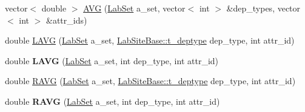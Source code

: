 \begin{DoxyCompactItemize}
\item 
vector$<$ double $>$ \hyperlink{classelps_1_1_lab_site_sets_calculator_a44b6d16e8dded5bdb17e45b59702b8c1}{A\+V\+G} (\hyperlink{classelps_1_1_lab_set}{Lab\+Set} a\+\_\+set, vector$<$ int $>$ \&dep\+\_\+types, vector$<$ int $>$ \&attr\+\_\+ids)
\item 
double \hyperlink{classelps_1_1_lab_site_sets_calculator_a55d8679aa0dff3104dc07af7639a7dc2}{L\+A\+V\+G} (\hyperlink{classelps_1_1_lab_set}{Lab\+Set} a\+\_\+set, \hyperlink{classelps_1_1_lab_site_base_a8ec08fafa015dfa53827d985608afe58}{Lab\+Site\+Base\+::t\+\_\+deptype} dep\+\_\+type, int attr\+\_\+id)
\item 
\hypertarget{classelps_1_1_lab_site_sets_calculator_a15ef11e25f40be9c5f6c6e20a976fa6d}{double {\bfseries L\+A\+V\+G} (\hyperlink{classelps_1_1_lab_set}{Lab\+Set} a\+\_\+set, int dep\+\_\+type, int attr\+\_\+id)}\label{classelps_1_1_lab_site_sets_calculator_a15ef11e25f40be9c5f6c6e20a976fa6d}

\item 
double \hyperlink{classelps_1_1_lab_site_sets_calculator_a4b5a7885456521a1abbcad3c30fbd20b}{R\+A\+V\+G} (\hyperlink{classelps_1_1_lab_set}{Lab\+Set} a\+\_\+set, \hyperlink{classelps_1_1_lab_site_base_a8ec08fafa015dfa53827d985608afe58}{Lab\+Site\+Base\+::t\+\_\+deptype} dep\+\_\+type, int attr\+\_\+id)
\item 
\hypertarget{classelps_1_1_lab_site_sets_calculator_a7ed349ebed1bfcf10c5b55948e8be4e6}{double {\bfseries R\+A\+V\+G} (\hyperlink{classelps_1_1_lab_set}{Lab\+Set} a\+\_\+set, int dep\+\_\+type, int attr\+\_\+id)}\label{classelps_1_1_lab_site_sets_calculator_a7ed349ebed1bfcf10c5b55948e8be4e6}


\end{DoxyCompactItemize}
